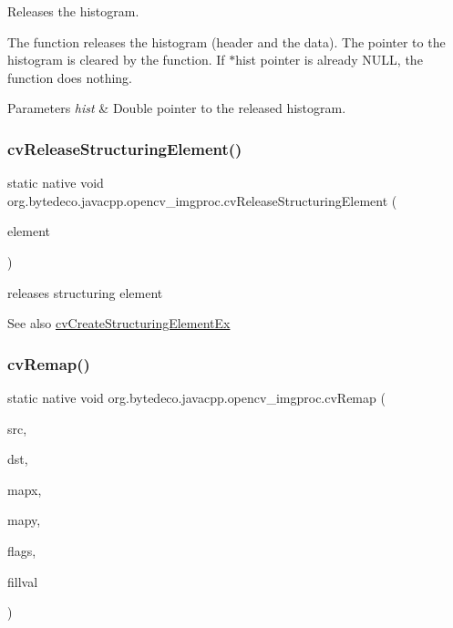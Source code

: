 Releases the histogram. 

The function releases the histogram (header and the data). The pointer to the histogram is cleared by the function. If $\ast$hist pointer is already N\+U\+LL, the function does nothing. 


\begin{DoxyParams}{Parameters}
{\em hist} & Double pointer to the released histogram. \\
\hline
\end{DoxyParams}
\mbox{\label{group__imgproc__c_gaddb6b08638fde5f3641e96a7b033f774}} 
\subsubsection{\texorpdfstring{cv\+Release\+Structuring\+Element()}{cvReleaseStructuringElement()}}
{\footnotesize\ttfamily static native void org.\+bytedeco.\+javacpp.\+opencv\+\_\+imgproc.\+cv\+Release\+Structuring\+Element (\begin{DoxyParamCaption}\item[{@Cast(\char`\"{}Ipl\+Conv\+Kernel$\ast$$\ast$\char`\"{}) Pointer\+Pointer}]{element }\end{DoxyParamCaption})\hspace{0.3cm}{\ttfamily [static]}}



releases structuring element 

\begin{DoxySeeAlso}{See also}
\hyperlink{group__imgproc__c_ga8a9b8019d4c181721e0f3fbb6c87cb42}{cv\+Create\+Structuring\+Element\+Ex} 
\end{DoxySeeAlso}
\mbox{\label{group__imgproc__c_ga5fc4449699da7b00973991b5b610efbb}} 
\subsubsection{\texorpdfstring{cv\+Remap()}{cvRemap()}}
{\footnotesize\ttfamily static native void org.\+bytedeco.\+javacpp.\+opencv\+\_\+imgproc.\+cv\+Remap (\begin{DoxyParamCaption}\item[{@Const Cv\+Arr}]{src,  }\item[{Cv\+Arr}]{dst,  }\item[{@Const Cv\+Arr}]{mapx,  }\item[{@Const Cv\+Arr}]{mapy,  }\item[{int}]{flags,  }\item[{@By\+Val(null\+Value=\char`\"{}Cv\+Scalar(cv\+Scalar\+All(0))\char`\"{}) Cv\+Scalar}]{fillval }\end{DoxyParamCaption})\hspace{0.3cm}{\ttfamily [static]}}



